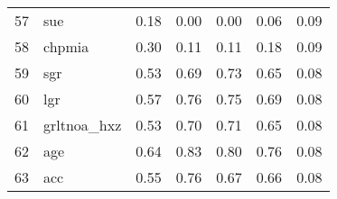 \documentclass[12pt]{article}
\begin{document}
\begin{footnotesize}
\begin{longtable}{rl|c|c|c|c|c}
57  & sue              & 0.18                                                                                      & 0.00                                                                                        & 0.00                                                                                         & 0.06 & 0.09               \\
58  & chpmia           & 0.30                                                                                      & 0.11                                                                                        & 0.11                                                                                         & 0.18 & 0.09               \\
59  & sgr              & 0.53                                                                                      & 0.69                                                                                        & 0.73                                                                                         & 0.65 & 0.08               \\
60  & lgr              & 0.57                                                                                      & 0.76                                                                                        & 0.75                                                                                         & 0.69 & 0.08               \\
61  & grltnoa\_hxz     & 0.53                                                                                      & 0.70                                                                                        & 0.71                                                                                         & 0.65 & 0.08               \\
62  & age              & 0.64                                                                                      & 0.83                                                                                        & 0.80                                                                                         & 0.76 & 0.08               \\
63  & acc              & 0.55                                                                                      & 0.76                                                                                        & 0.67                                                                                         & 0.66 & 0.08               \\

\end{longtable}
\end{footnotesize}
\end{document}
